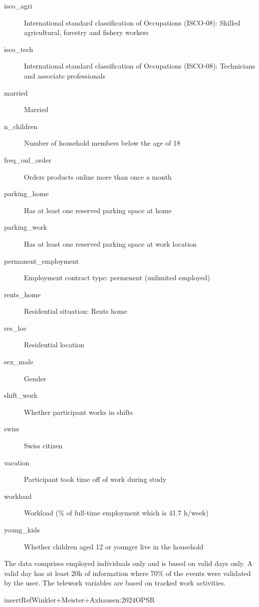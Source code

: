 \documentclass[letterpaper]{book}
\begin{document}
\begin{Format}
\begin{description}
\item[isco\_agri] International standard classification of Occupations (ISCO-08): Skilled agricultural, forestry and fishery workers
\item[isco\_tech] International standard classification of Occupations (ISCO-08): Technicians and associate professionals
\item[married] Married
\item[n\_children] Number of household members below the age of 18
\item[freq\_onl\_order] Orders products online more than once a month
\item[parking\_home] Has at least one reserved parking space at home
\item[parking\_work] Has at least one reserved parking space at work location
\item[permanent\_employment] Employment contract type: permenent (unlimited employed)
\item[rents\_home] Residential situation: Rents home
\item[res\_loc] Residential location
\item[sex\_male] Gender
\item[shift\_work] Whether participant works in shifts
\item[swiss] Swiss citizen
\item[vacation] Participant took time off of work during study
\item[workload] Workload (\% of full-time employment which is 41.7 h/week)
\item[young\_kids] Whether children aged 12 or younger live in the household

\end{description}

\end{Format}
%
\begin{Details}
The data comprises employed individuals only and is based on valid days only.
A valid day has at least 20h of information where 70\% of the events were
validated by the user. The telework variables are based on tracked work activities.
\end{Details}
%
\begin{References}
\bsl{}insertRefWinkler+Meister+Axhausen:2024OPSR
\end{References}
\printindex{}
\end{document}
